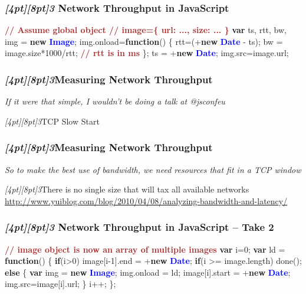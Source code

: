 \documentclass{beamer}
\newcommand{\sn}[1]{\textrm{\textit{\Huge{\raisebox{-3pt}[4pt][8pt]{\textcolor{f2elblue}{#1}}}}}\hspace{4pt}}
\newcommand{\innersplash}[1]{
  \begin{center}
    \large \textrm{\textit{ #1 } }
  \end{center}
}
\newcommand{\splashslide}[2][{}]{
  \begin{frame}
  \frametitle{#1}
  \innersplash{#2}
  \end{frame}
}
\def\brown<#1>#2{\textcolor<#1>{brown}{\textbf<#1>{#2}}}
\def\green<#1>#2{\textcolor<#1>{dark-green}{\textbf<#1>{#2}}}
\def\blue<#1>#2{\textcolor<#1>{blue}{\textbf<#1>{#2}}}
\begin{document}
\begin{frame}[fragile]
\frametitle{\sn{3} Network Throughput in JavaScript}
\begin{semiverbatim}
\brown<1>{// Assume global object
// image=\{ url: ..., size: ... \}}
\green<1>{var} ts, rtt, bw, img = \green<1>{new} \blue<1>{Image};
img.onload=\green<1>{function}() \{
   rtt=(+\green<1>{new} \blue<1>{Date} - ts);
   bw = image.size*1000/rtt;    \brown<1>{// rtt is in ms}
\};
ts = +\green<1>{new} \blue<1>{Date};
img.src=image.url;
\end{semiverbatim}
\end{frame}

\splashslide[\sn{3}Measuring Network Throughput]{If it were that simple, I wouldn't be doing a talk at @jsconfeu}

\begin{frame}{\sn{3}TCP Slow Start}
\end{frame}

\splashslide[\sn{3}Measuring Network Throughput]{So to make the best use of bandwidth, we need resources that fit in a TCP window}

\begin{frame}{\sn{3}There is no single size that will tax all available networks }
\vspace{6cm}
\tiny \href{http://www.yuiblog.com/blog/2010/04/08/analyzing-bandwidth-and-latency/}{http://www.yuiblog.com/blog/2010/04/08/analyzing-bandwidth-and-latency/}
\end{frame}

\begin{frame}[fragile]
\frametitle{\sn{3} Network Throughput in JavaScript -- Take 2}
\begin{semiverbatim}
\brown<1>{// image object is now an array of multiple images}
\green<1>{var} i=0;
\green<1>{var} ld = \green<1>{function}() \{
   \green<1>{if}(i>0)
      image[i-1].end = +\green<1>{new} \blue<1>{Date};
   \green<1>{if}(i >= image.length)
      done();
   \green<1>{else} \{
      \green<1>{var} img = \green<1>{new} \blue<1>{Image};
      img.onload = ld;
      image[i].start = +\green<1>{new} \blue<1>{Date};
      img.src=image[i].url;
   \}
   i++;
\};
\end{semiverbatim}
\end{frame}
\end{document}
